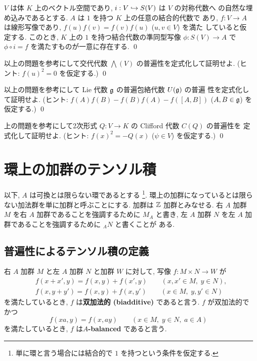 \documentclass[12pt,twoside]{jarticle}
\begin{document}
\begin{question}[対称代数の普遍性]
  $V$ は体 $K$ 上のベクトル空間であり, $i:V\hookrightarrow S(V)$ は $V$ の対称代数へ
  の自然な埋め込みであるとする. $A$ は $1$ を持つ $K$ 上の任意の結合的代数で
  あり, $f:V\to A$ は線形写像であり, $f(u)f(v)=f(v)f(u)$ ($u,v\in V$) を満た
  していると仮定する. 
  このとき, $K$ 上の $1$ を持つ結合代数の準同型写像 $\phi:S(V)\to A$ 
  で $\phi\circ i=f$ を満たすものが一意に存在する. \qed
\end{question}

\begin{question}[交代代数の普遍性]
  以上の問題を参考にして交代代数 $\bigwedge(V)$ の普遍性を定式化して証明せよ.
  (ヒント: $f(u)^2=0$ を仮定する.)
  \qed 
\end{question}

\begin{question}[普遍包絡代数の普遍性]
  以上の問題を参考にして Lie 代数 ${\mathfrak g}$ の普遍包絡代数 $U({\mathfrak g})$ の普遍
  性を定式化して証明せよ. 
  (ヒント: $f(A)f(B) - f(B)f(A) - f([A,B])$ ($A,B\in{\mathfrak g}$) を仮定する.)
  \qed 
\end{question}

\begin{question}
  上の問題を参考にして2次形式 $Q:V\to K$ の Clifford 代数 $C(Q)$ の普遍性を
  定式化して証明せよ. 
  (ヒント: $f(x)^2 = - Q(x)$ ($\psi\in V$) を仮定する.)
  \qed
\end{question}


\section{環上の加群のテンソル積}

以下, $A$ は可換とは限らない環であるとする%
\footnote{単に環と言う場合には結合的で $1$ を持つという条件を仮定する.}.
環上の加群になっているとは限らない加法群を単に加群と呼ぶことにする.
加群は ${\mathbb Z}$ 加群とみなせる.
右 $A$ 加群 $M$ を右 $A$ 加群であることを強調するために $M_A$ と書き,
左 $A$ 加群 $N$ を左 $A$ 加群であることを強調するために ${}_AN$ と書くことが
ある.

\subsection{普遍性によるテンソル積の定義}

右 $A$ 加群 $M$ と左 $A$ 加群 $N$ と加群 $W$ に対して,
写像 $f:M\times N\to W$ が
\begin{align*}
  &
  f(x+x',y) = f(x,y) + f(x',y) \qquad (x,x'\in M,\;y\in N),
  \\ &
  f(x,y+y') = f(x,y) + f(x,y') \qquad (x\in M,\;y,y'\in N)
\end{align*}
を満たしているとき, $f$ は{\bf 双加法的 (biadditive)} であると言う.
$f$ が双加法的でかつ
\begin{equation*}
  f(xa,y) = f(x,ay) \qquad (x\in M,\; y\in N,\; a\in A)
\end{equation*}
を満たしているとき, $f$ は{\bf $A$-balanced} であると言う.
\end{document}
